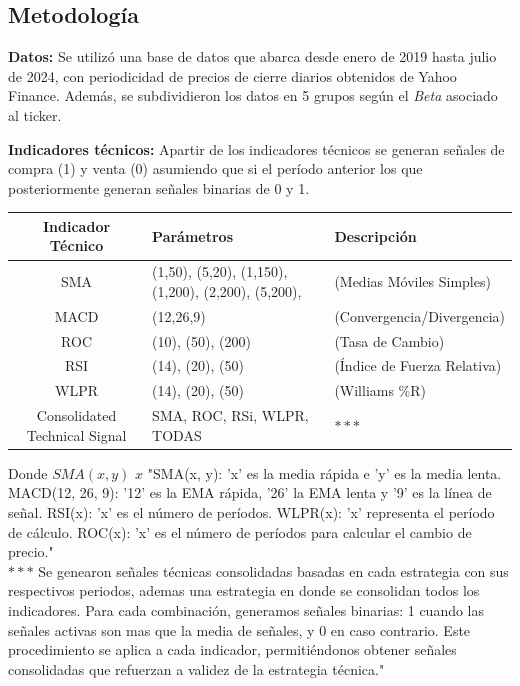 \documentclass[a0,portrait]{a0poster}
\newcommand{\customsection}[1]{
    \begin{center}
        \begin{tcolorbox}[colframe=miRojo!50, colback=miRojo, width=\linewidth, boxrule=1mm, arc=3mm, auto outer arc]
            \centering
            \vspace{.5cm} %
            \color{white}
            \section*{ \textbf{\Huge #1}}  %
            \vspace{.2cm} %
        \end{tcolorbox}
    \end{center}
}
\begin{document}
\begin{multicols}{2}
\begin{minipage}{.984\linewidth}
        \end{minipage}
    \customsection{Metodología}
    \par
    \textbf{Datos:} Se utilizó una base de datos que abarca desde enero de 2019 hasta julio de 2024, con periodicidad de precios
     de cierre diarios obtenidos de Yahoo Finance. Además, se subdividieron los datos en 5 grupos según el \textit{Beta} asociado al ticker.  
    \par
    \textbf{Indicadores técnicos:} Apartir de los indicadores técnicos se generan señales de compra (1) y venta (0) asumiendo que si el período anterior
     los que posteriormente generan señales binarias de 0 y 1.\\
     \begin{minipage}{.984\linewidth}
        \centering
        \vspace{1cm}
        \begin{tabular}{c p{10cm} l}
            \toprule
            \textbf{Indicador Técnico} & \textbf{Parámetros} & \textbf{Descripción}\\
            \midrule
             SMA & (1,50), (5,20), (1,150), (1,200), (2,200), (5,200),  & (Medias Móviles Simples)\\
             MACD & (12,26,9) & (Convergencia/Divergencia) \\
             ROC & (10), (50), (200) & (Tasa de Cambio) \\
             RSI & (14), (20), (50) & (Índice de Fuerza Relativa) \\
             WLPR & (14), (20), (50) &  (Williams \%R)\\
             Consolidated Technical Signal& SMA, ROC, RSi, WLPR, TODAS & \textbf{$***$} \\
            \bottomrule
        \end{tabular}
        \captionsetup{width=0.8\textwidth}  %
        \caption*{\footnotesize Donde $SMA(x,y)$ $x$ "SMA(x, y): 'x' es la media rápida e 'y' es la media lenta. MACD(12, 26, 9): '12' 
        es la EMA rápida, '26' la EMA lenta y '9' es la línea de señal. RSI(x): 'x' es el número de períodos. WLPR(x): 'x' representa el período de cálculo. 
        ROC(x): 'x' es el número de períodos para calcular el cambio de precio."\\
        \textbf{$***$} Se genearon señales técnicas consolidadas basadas en cada estrategia con sus respectivos periodos, ademas una estrategia en donde se consolidan todos los indicadores. 
        Para cada combinación, generamos señales binarias: 1 cuando las señales activas son mas que la media de señales, y 0 en caso contrario. 
        Este procedimiento se aplica a cada indicador, permitiéndonos obtener señales consolidadas que refuerzan a validez de la estrategia técnica."
        }
        

\end{minipage}
\end{multicols}
\end{document}
